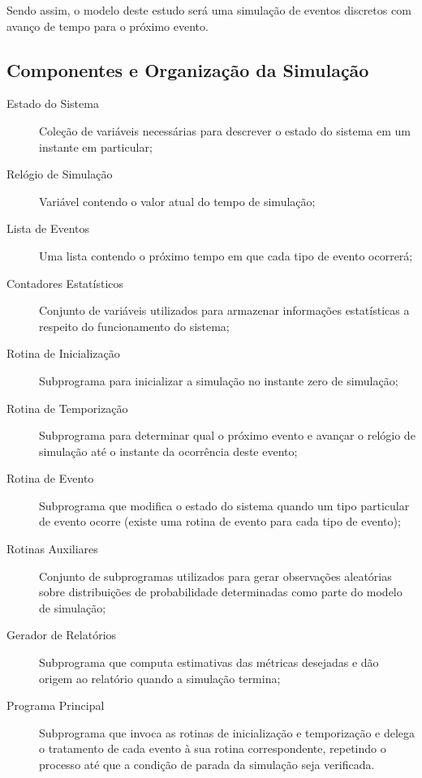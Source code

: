 Sendo assim, o modelo deste estudo será uma simulação de eventos discretos com avanço de tempo para o próximo evento.

\subsection{Componentes e Organização da Simulação}

\begin{description}
\item[Estado do Sistema] Coleção de variáveis necessárias para descrever o estado do sistema em um instante em particular;
\item[Relógio de Simulação] Variável contendo o valor atual do tempo de simulação;
\item[Lista de Eventos] Uma lista contendo o próximo tempo em que cada tipo de evento ocorrerá;
\item[Contadores Estatísticos] Conjunto de variáveis utilizados para armazenar informações estatísticas a respeito do funcionamento do sistema;
\item[Rotina de Inicialização] Subprograma para inicializar a simulação no instante zero de simulação;
\item[Rotina de Temporização] Subprograma para determinar qual o próximo evento e avançar o relógio de simulação até o instante da ocorrência deste evento;
\item[Rotina de Evento] Subprograma que modifica o estado do sistema quando um tipo particular de evento ocorre (existe uma rotina de evento para cada tipo de evento);
\item[Rotinas Auxiliares] Conjunto de subprogramas utilizados para gerar observações aleatórias sobre distribuições de probabilidade determinadas como parte do modelo de simulação;
\item[Gerador de Relatórios] Subprograma que computa estimativas das métricas desejadas e dão origem ao relatório quando a simulação termina;
\item[Programa Principal] Subprograma que invoca as rotinas de inicialização e temporização e delega o tratamento de cada evento à sua rotina correspondente, repetindo o processo até que a condição de parada da simulação seja verificada.
\end{description}

